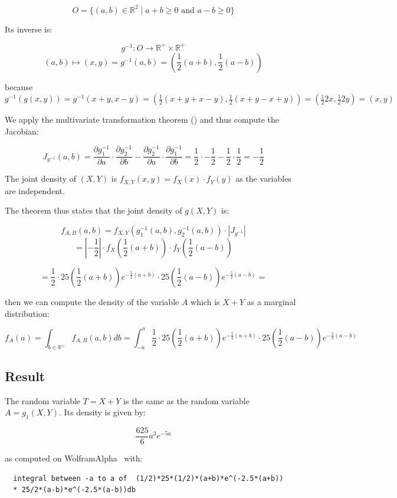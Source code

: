 \documentclass{article}
\newcommand\R{{\mathbb R} }
\begin{document}
$$O = \{ (a,b)\in\R^2 \mid a+b \geq 0 \mbox{ and } a-b\geq 0\}$$

Its inverse is:

$$ g^{-1}: O \longrightarrow \R^+ \times \R^+$$
$$ (a,b) \mapsto (x,y) = g^{-1}(a,b) = \left( \frac{1}{2} (a+b), \frac{1}{2}(a-b) \right)$$

because $g^{-1} (g(x,y)) = g^{-1}(x+y, x-y) = \left ( \frac{1}{2} (x+y+x-y), \frac{1}{2} ( x+y-x+y) \right ) = \left ( \frac{1}{2} 2x, \frac{1}{2} 2y\right ) = (x,y)$


We apply the multivariate transformation theorem (\cite[2.7]{Hogg-McKean}) and thus compute the Jacobian:

\newcommand{\half}{\frac{1}{2}}

$$J_{g^{-1}}(a,b) =  
   \frac{\partial g^{-1}_1}{\partial a}\cdot\frac{\partial g^{-1}_2}{\partial b}- \frac{\partial g^{-1}_2}{\partial a}\cdot\frac{\partial g^{-1}_1}{\partial b}
    = \half\cdot-\half-\half\cdot\half=-\frac{1}{2}$$

The joint density of $(X,Y)$ is $f_{X,Y}(x,y) = f_X(x)\cdot f_Y(y)$ as the variables are independent.

The theorem thus states that the joint density of $g(X,Y)$ is:

$$ f_{A,B}(a,b) = f_{X,Y}\left( g_1^{-1}(a,b), g_2^{-1}(a,b)\right) \cdot | J_{g^{-1}} | $$
$$ = |-\frac{1}{2}|\cdot f_X(\frac{1}{2}(a+b))\cdot f_Y(\frac{1}{2}(a-b))$$

$$ = \frac{1}{2} \cdot 25(\frac{1}{2}(a+b))e^{-\frac{5}{2}(a+b)} 
           \cdot 25(\frac{1}{2}(a-b))e^{-\frac{5}{2}(a-b)} = $$

then we can compute the density of the variable $A$ which is $X+Y$ as a marginal distribution: 

$$f_A(a) = \int_{b\in\R^+} f_{A,B}(a,b) db = \int _{-a}^{a} \frac{1}{2} \cdot 25(\frac{1}{2}(a+b))e^{-\frac{5}{2}(a+b)} 
           \cdot 25(\frac{1}{2}(a-b))e^{-\frac{5}{2}(a-b)}$$
      
\subsection{Result}

The random variable $T=X+Y$ is the same as the random variable $A = g_1(X,Y)$. Its density is given by:
           
           $$ \frac{625}{6} a^3 e^{-5 a} $$

as computed on WolframAlpha~\cite{wolfram-alpha} with:

\begin{verbatim}
  integral between -a to a of  (1/2)*25*(1/2)*(a+b)*e^(-2.5*(a+b)) 
  * 25/2*(a-b)*e^(-2.5*(a-b))db
\end{verbatim}




\end{document}
